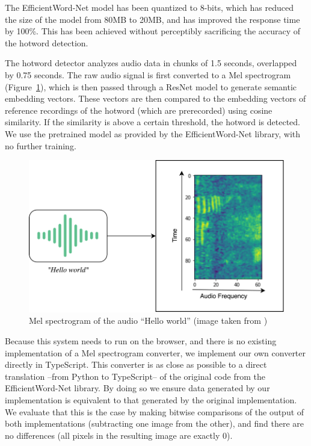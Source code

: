 \documentclass[a4paper,12pt,twoside]{ThesisStyle}
\begin{document}
The EfficientWord-Net model has been quantized to 8-bits, which has reduced the size of the model from 80MB to 20MB, and has improved the response time by 100\%. This has been achieved without perceptibly sacrificing the accuracy of the hotword detection.

The hotword detector analyzes audio data in chunks of 1.5 seconds, overlapped by 0.75 seconds. The raw audio signal is first converted to a Mel spectrogram (Figure~\ref{fig:mel_spectrogram}), which is then passed through a ResNet \cite{He2015DeepResidualLearningImage} model to generate semantic embedding vectors. These vectors are then compared to the embedding vectors of reference recordings of the hotword (which are prerecorded) using cosine similarity. If the similarity is above a certain threshold, the hotword is detected.
We use the pretrained model as provided by the EfficientWord-Net library, with no further training.

\begin{figure}[htb]
  \centering
  \includegraphics[width=1\textwidth]{img/MelSpectrogram.png}
  \caption{Mel spectrogram of the audio ``Hello world'' (image taken from \cite{Chidhambararajan2022EfficientWordNet})}
  \label{fig:mel_spectrogram}
\end{figure}

Because this system needs to run on the browser, and there is no existing implementation of a Mel spectrogram converter, we implement our own converter directly in TypeScript. This converter is as close as possible to a direct translation --from Python to TypeScript-- of the original code from the EfficientWord-Net library. By doing so we ensure data generated by our implementation is equivalent to that generated by the original implementation. We evaluate that this is the case by making bitwise comparisons of the output of both implementations (subtracting one image from the other), and find there are no differences (all pixels in the resulting image are exactly 0).
\end{document}

